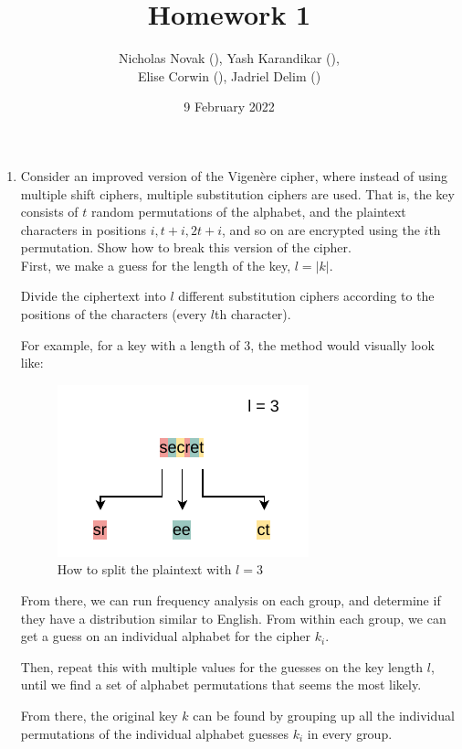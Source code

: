 \documentclass{article}
\title{Homework 1}
\date{9 February 2022}
\author{Nicholas Novak (), Yash Karandikar (),\\
Elise Corwin (), Jadriel Delim ()}
\begin{document}
\maketitle

\begin{enumerate}
  \item Consider an improved version of the Vigen\`ere cipher, where instead of
    using multiple shift ciphers, multiple substitution ciphers are used. That
    is, the key consists of $t$ random permutations of the alphabet, and the 
    plaintext characters in positions $i, t + i, 2t + i$, and so on are 
    encrypted using the $i$th permutation. Show how to break this version of 
    the cipher.\\

    First, we make a guess for the length of the key, $l = \vert k\vert$.

    Divide the ciphertext into $l$ different substitution ciphers according to
    the positions of the characters (every $l$th character).

    For example, for a key with a length of $3$, the method would visually
    look like:
    \begin{figure}[h]
      \centering
      \caption{How to split the plaintext with $l = 3$}
      \includegraphics{improved-vigenere-split-diagram.pdf}
    \end{figure}

    From there, we can run frequency analysis on each group, and determine if
    they have a distribution similar to English. From within each group, we can
    get a guess on an individual alphabet for the cipher $k_i$.

    Then, repeat this with multiple values for the guesses on the key length $l$,
    until we find a set of alphabet permutations that seems the most likely.

    From there, the original key $k$ can be found by grouping up all the 
    individual permutations of the individual alphabet guesses $k_i$ in every 
    group.


\end{enumerate}
\end{document}
